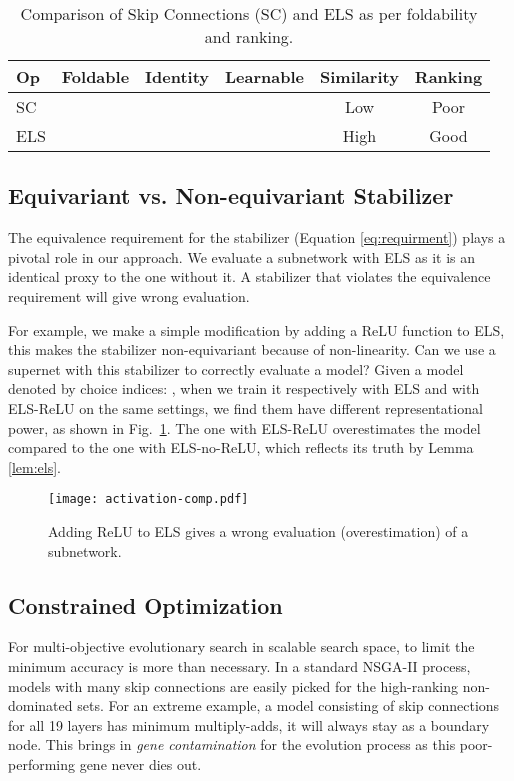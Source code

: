 \documentclass[10pt,twocolumn,letterpaper]{article}
\newcommand{\cmark}{\ding{51}}\newcommand{\xmark}{\ding{55}}
\theoremstyle{definition}
\begin{document}
\setlength{\tabcolsep}{4pt}
\begin{table}
	\centering
	\begin{tabular} {|l*{5}{|c}|}
		\hline
		Op  & Foldable & Identity  & Learnable & Similarity & Ranking \\
		\hline
		SC  & \cmark & \cmark & \xmark & Low & Poor\\
		ELS  & \cmark & \cmark & \cmark & High & Good\\
		\hline
	\end{tabular}
	\caption{Comparison of Skip Connections (SC) and ELS as per foldability and ranking.} \label{tab:comp-sc-els}
\end{table}


\subsection{Equivariant vs. Non-equivariant Stabilizer}

The equivalence requirement for the stabilizer (Equation \ref{eq:requirment}) plays a pivotal role in our approach. We evaluate a subnetwork with ELS as it is an identical proxy to the one without it. A stabilizer that violates the equivalence requirement will give wrong evaluation. 

For example, we make a simple modification by adding a ReLU function to ELS, this makes the stabilizer non-equivariant because of non-linearity. Can we use a supernet with this stabilizer to correctly evaluate a model? Given a model denoted by choice indices: ,  when we train it respectively with ELS and with ELS-ReLU on the same settings, we find them have different representational power, as shown in Fig.~\ref{fig:activation-comp}. The one with ELS-ReLU overestimates the model compared to the one with ELS-no-ReLU, which reflects its truth by Lemma \ref{lem:els}. 

\begin{figure}[ht]
	\centering
	\texttt{[image: activation-comp.pdf]}
	\caption{Adding ReLU to ELS gives a wrong evaluation (overestimation) of a subnetwork.}
	\label{fig:activation-comp}
\end{figure}


\subsection{Constrained Optimization}

For multi-objective evolutionary search in scalable search space, to limit the minimum accuracy is more than necessary. In a standard NSGA-II \cite{deb2002fast} process, models with many skip connections are easily picked for the high-ranking non-dominated sets. For an extreme example, a model consisting of skip connections for all 19 layers has minimum multiply-adds, it will always stay as a boundary node. This brings in \emph{gene contamination} for the evolution process as this poor-performing gene never dies out.
\end{document}
